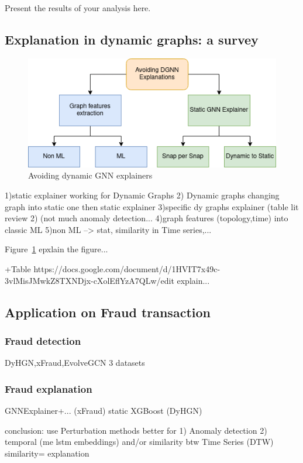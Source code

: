 Present the results of your analysis here.

\subsection{Explanation in dynamic graphs: a survey}


\begin{figure}[!h]
    \centering \includegraphics[width = 355pt]{Thesis_group_report_template_liris_en/images/Avoiding DGNN Explainability Diagram.drawio.png}
    \caption{Avoiding dynamic GNN explainers} \label{fig:image}
    \label{other expl}
\end{figure}

1)static explainer working for Dynamic Graphs
2) Dynamic graphs changing graph into static one then static explainer
3)specific dy graphs explainer (table lit review 2) (not much anomaly detection...
4)graph features (topology,time) into classic ML
5)non ML --> stat, similarity in Time series,...

Figure~\ref{other expl} epxlain the figure...

+Table https://docs.google.com/document/d/1HVIT7x49c-3vlMisJMwkZ8TXNDjx-cXolEflYzA7QLw/edit explain...

\subsection{Application on Fraud transaction}

\subsubsection{Fraud detection}
DyHGN,xFraud,EvolveGCN
3 datasets

\subsubsection{Fraud explanation}
GNNExplainer+... (xFraud) static
XGBoost (DyHGN)

conclusion: use Perturbation methods better for 1) Anomaly detection 2) temporal (me lstm embeddings)
and/or similarity btw Time Series (DTW) similarity= explanation